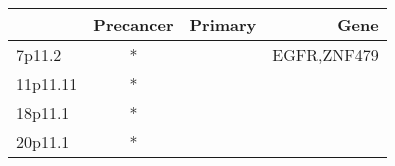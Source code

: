 \begin{tabular}{lccr}
\toprule
{} & Precancer & Primary &         Gene \\
\midrule
7p11.2   &         * &         &  EGFR,ZNF479 \\
11p11.11 &         * &         &              \\
18p11.1  &         * &         &              \\
20p11.1  &         * &         &              \\
\bottomrule
\end{tabular}
